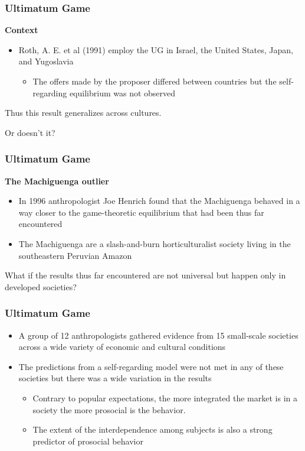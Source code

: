 \documentclass{beamer}
\begin{document}
\begin{frame}
	\frametitle{Ultimatum Game}
	\textbf{Context}
	
	\begin{itemize}
		\item Roth, A. E. et al (1991) employ the UG in Israel, the United States, Japan, and Yugoslavia
		\begin{itemize}
			\item The offers made by the proposer differed between countries but the self-regarding equilibrium was not observed
		\end{itemize}
	\end{itemize}
	Thus this result generalizes across cultures. 
	
	Or doesn't it?
	
\end{frame}

\begin{frame}
	\frametitle{Ultimatum Game}
	\textbf{The Machiguenga outlier}
	
	\begin{itemize}
		\item In 1996 anthropologist Joe Henrich found that the Machiguenga behaved in a way closer to the game-theoretic equilibrium that had been thus far encountered
		\item The Machiguenga are a slash-and-burn horticulturalist society living in the southeastern Peruvian Amazon
	\end{itemize}

What if the results thus far encountered are not universal but happen only in developed societies?
\end{frame}

\begin{frame}
	\frametitle{Ultimatum Game}
	
	\begin{itemize}
		\item A group of 12 anthropologists gathered evidence from 15 small-scale societies across a wide variety of economic and cultural conditions
		\item The predictions from a self-regarding model were not met in any of these societies but there was a wide variation in the results
			\begin{itemize}
				\item Contrary to popular expectations, the more integrated the market is in a society the more prosocial is the behavior. 
				\item The extent of the interdependence among subjects is also a strong predictor of prosocial behavior
			\end{itemize}
	\end{itemize}
\end{frame}
\end{document}
